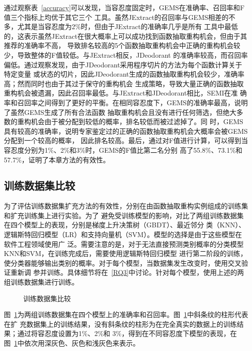 通过观察表~\ref{accuracy}可以发现，当容忍度固定时，GEMS在准确率、召回率和F值三个指标上均优于其它三个
工具。虽然JExtract的召回率与GEMS相差的不多，尤其是当容忍度为2\%时，但由于JExtract的准确率几乎是所有
工具中最低的，这表示虽然JExtract在很大概率上可以成功找到函数抽取重构机会，但由于其推荐的准确率不高，
导致排名较高的5个函数抽取重构机会中正确的重构机会较少，导致整体的F值较低。与JExtract相反，JDeodorant
的准确率较高，而召回率偏低。通过观察发现，由于JDeodorant采用程序切片的方法为每个函数计算关于特定变量
或状态的切片，因此JDeodorant生成的函数抽取重构机会较少，准确率高；然而同时也由于其过于保守的重构机会
生成策略，导致大量正确的函数抽取重构机会被遗漏，因此召回率最低。与JExtract和JDeodorant相比，SEMI在准
确率和召回率之间得到了更好的平衡。在相同容忍度下，GEMS的准确率最高，说明了虽然GEMS生成了所有合法函数
抽取重构机会且没有进行任何筛选，但绝大多数的重构机会由于被分配到较低的概率，排名较低而被过滤掉了。同
时，GEMS具有较高的准确率，说明专家鉴定过的正确的函数抽取重构机会大概率会被GEMS分配到一个较高的概率，
因此排名较高。最后，通过对F值进行计算，可以得到当容忍度分别为1\%、2\%和3\%时，GEMS的F值比第二名分别
高了55.8\%、73.1\%和57.7\%，证明了本章方法的有效性。

\subsection{训练数据集比较}\label{RQ2}
为了评估训练数据集扩充方法的有效性，分别在由函数抽取重构实例组成的训练集和扩充训练集上进行实验。为了
避免受训练模型的影响，对比了两组训练数据集在四个模型上的表现，分别是梯度上升决策树（GBDT）、最近邻分
类（KNN）、逻辑斯特回归模型（LR）和支持向量机（SVM）。模型的选择是由于这些模型在软件工程领域使用广
泛。需要注意的是，对于无法直接预测类别概率的分类模型KNN和SVM，在训练完成后，需要使用逻辑斯特回归模型
进行第二阶段的训练，使分类器能够输出类别的概率。对于每个模型，当数据集发生改变时，使用交叉验证重新调
参并训练。具体细节将在~\ref{RQ3}中讨论。针对每个模型，使用上述的两组训练数据集进行训练。

\begin{figure}
\centering
{}
\hfill
{}
\caption{训练数据集比较}
\label{dataset}
\end{figure}

图~\ref{dataset}为两组训练数据集在四个模型上的准确率和召回率。图~\ref{dataset}中斜条纹的柱形代表在扩
充数据集上的训练结果，没有斜条纹的柱形为在完全真实的数据上的训练结果；通过将容忍度设置为1\%、2\%和
3\%，得到在不同容忍度下模型的表现，在图~\ref{dataset}中依次用深灰色、灰色和浅灰色来表示。

